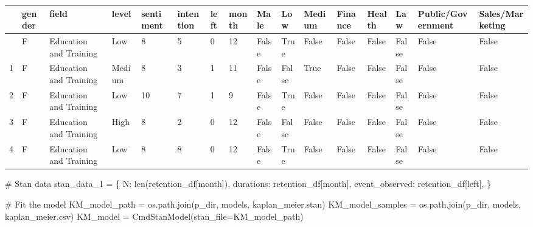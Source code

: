 \documentclass[
  letterpaper,
  DIV=11,
  numbers=noendperiod]{scrartcl}
\newenvironment{Shaded}{\begin{snugshade}}{\end{snugshade}}
\newcommand{\BuiltInTok}[1]{\textcolor[rgb]{0.00,0.23,0.31}{#1}}
\newcommand{\CommentTok}[1]{\textcolor[rgb]{0.37,0.37,0.37}{#1}}
\newcommand{\NormalTok}[1]{\textcolor[rgb]{0.00,0.23,0.31}{#1}}
\newcommand{\OperatorTok}[1]{\textcolor[rgb]{0.37,0.37,0.37}{#1}}
\newcommand{\StringTok}[1]{\textcolor[rgb]{0.13,0.47,0.30}{#1}}
\begin{document}
\begin{longtable}[]{@{}llllllllllllllll@{}}
\toprule\noalign{}
& gender & field & level & sentiment & intention & left & month & Male &
Low & Medium & Finance & Health & Law & Public/Government &
Sales/Marketing \\
\midrule\noalign{}
\endhead
\bottomrule\noalign{}
\endlastfoot
0 & F & Education and Training & Low & 8 & 5 & 0 & 12 & False & True &
False & False & False & False & False & False \\
1 & F & Education and Training & Medium & 8 & 3 & 1 & 11 & False & False
& True & False & False & False & False & False \\
2 & F & Education and Training & Low & 10 & 7 & 1 & 9 & False & True &
False & False & False & False & False & False \\
3 & F & Education and Training & High & 8 & 2 & 0 & 12 & False & False &
False & False & False & False & False & False \\
4 & F & Education and Training & Low & 8 & 8 & 0 & 12 & False & True &
False & False & False & False & False & False \\
\end{longtable}

\begin{Shaded}
\begin{Highlighting}[]
\CommentTok{\# Stan data}
\NormalTok{stan\_data\_1 }\OperatorTok{=}\NormalTok{ \{}
  \StringTok{\textquotesingle{}N\textquotesingle{}}\NormalTok{: }\BuiltInTok{len}\NormalTok{(retention\_df[}\StringTok{\textquotesingle{}month\textquotesingle{}}\NormalTok{]),}
  \StringTok{\textquotesingle{}durations\textquotesingle{}}\NormalTok{: retention\_df[}\StringTok{\textquotesingle{}month\textquotesingle{}}\NormalTok{],}
  \StringTok{\textquotesingle{}event\_observed\textquotesingle{}}\NormalTok{: retention\_df[}\StringTok{\textquotesingle{}left\textquotesingle{}}\NormalTok{],}
\NormalTok{\}}

\CommentTok{\# Fit the model}
\NormalTok{KM\_model\_path }\OperatorTok{=}\NormalTok{ os.path.join(p\_dir, }\StringTok{\textquotesingle{}models\textquotesingle{}}\NormalTok{, }\StringTok{\textquotesingle{}kaplan\_meier.stan\textquotesingle{}}\NormalTok{)}
\NormalTok{KM\_model\_samples }\OperatorTok{=}\NormalTok{ os.path.join(p\_dir, }\StringTok{\textquotesingle{}models\textquotesingle{}}\NormalTok{, }\StringTok{\textquotesingle{}kaplan\_meier.csv\textquotesingle{}}\NormalTok{)}
\NormalTok{KM\_model }\OperatorTok{=}\NormalTok{ CmdStanModel(stan\_file}\OperatorTok{=}\NormalTok{KM\_model\_path)}
\end{Highlighting}
\end{Shaded}
\end{document}
